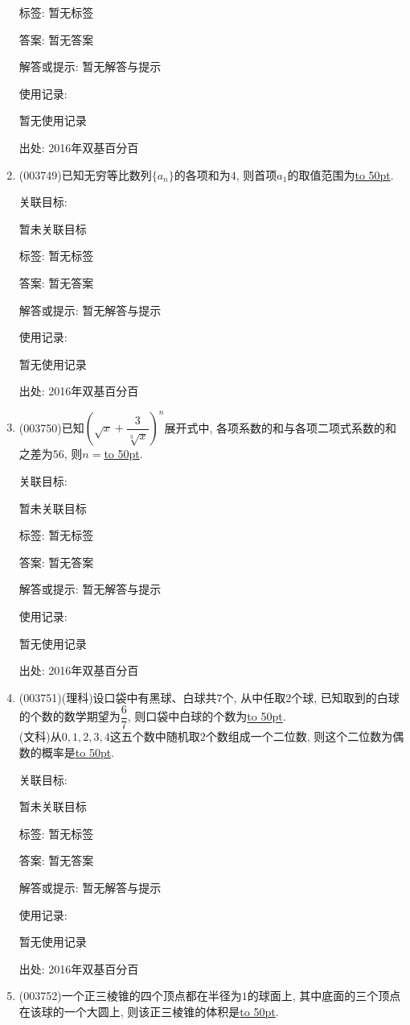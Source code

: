 \documentclass[10pt,a4paper]{article}
\newcommand{\blank}[1]{\underline{\hbox to #1pt{}}}
\begin{document}
\begin{enumerate}[1.]
标签: 暂无标签

答案: 暂无答案

解答或提示: 暂无解答与提示

使用记录:

暂无使用记录


出处: 2016年双基百分百
\item { (003749)}已知无穷等比数列$\{a_n\}$的各项和为$4$, 则首项$a_1$的取值范围为\blank{50}.


关联目标:

暂未关联目标



标签: 暂无标签

答案: 暂无答案

解答或提示: 暂无解答与提示

使用记录:

暂无使用记录


出处: 2016年双基百分百
\item { (003750)}已知$\left(\sqrt{x}+\dfrac 3{\sqrt[3]{x}}\right)^n$展开式中, 各项系数的和与各项二项式系数的和之差为$56$, 则$n=$\blank{50}.


关联目标:

暂未关联目标



标签: 暂无标签

答案: 暂无答案

解答或提示: 暂无解答与提示

使用记录:

暂无使用记录


出处: 2016年双基百分百
\item { (003751)}(理科)设口袋中有黑球、白球共$7$个, 从中任取$2$个球, 已知取到的白球的个数的数学期望为$\dfrac 6 7$, 则口袋中白球的个数为\blank{50}.\\
(文科)从$0,1,2,3,4$这五个数中随机取$2$个数组成一个二位数, 则这个二位数为偶数的概率是\blank{50}.


关联目标:

暂未关联目标



标签: 暂无标签

答案: 暂无答案

解答或提示: 暂无解答与提示

使用记录:

暂无使用记录


出处: 2016年双基百分百
\item { (003752)}一个正三棱锥的四个顶点都在半径为$1$的球面上, 其中底面的三个顶点在该球的一个大圆上, 则该正三棱锥的体积是\blank{50}.



\end{enumerate}
\end{document}
